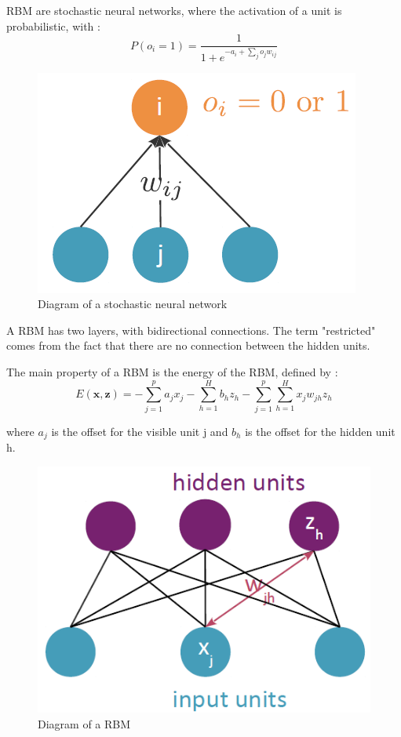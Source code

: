 \documentclass{article}
\begin{document}
RBM are stochastic neural networks, where the activation of a unit is probabilistic, with : \[P(o_i = 1) = \frac{1}{1+e^{-a_i+\sum_j o_j w_{ij}}}\]

\begin{figure}[!h]
    \center
    \includegraphics[scale=0.5]{./figures/autoencoder_stochastic.png}
    \caption{Diagram of a stochastic neural network}
\end{figure}

A RBM has two layers, with bidirectional connections. The term "restricted" comes from the fact that there are no connection between the hidden units.

The main property of a RBM is the energy of the RBM, defined by : \[E(\textbf{x},\textbf{z}) = - \sum\limits_{j=1}^p a_jx_j - \sum\limits_{h=1}^H b_hz_h - \sum\limits_{j=1}^p\sum\limits_{h=1}^H x_jw_{jh}z_h\]

where $a_j$ is the offset for the visible unit j and $b_h$ is the offset for the hidden unit h.

\begin{figure}[!h]
    \center
    \includegraphics[scale=0.5]{./figures/autoencoder_rbm.png}
    \caption{Diagram of a RBM}
\end{figure}
\end{document}
